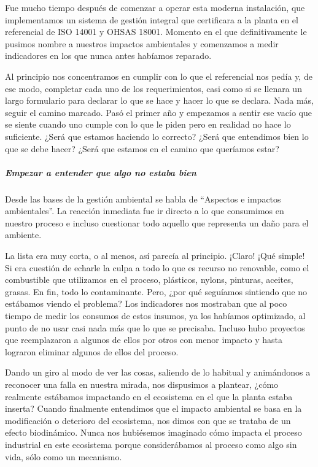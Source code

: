 \documentclass[
]{article}
\begin{document}
Fue mucho tiempo después de comenzar a operar esta moderna instalación,
que implementamos un sistema de gestión integral que certificara a la
planta en el referencial de ISO 14001 y OHSAS 18001. Momento en el que
definitivamente le pusimos nombre a nuestros impactos ambientales y
comenzamos a medir indicadores en los que nunca antes habíamos reparado.

Al principio nos concentramos en cumplir con lo que el referencial nos
pedía y, de ese modo, completar cada uno de los requerimientos, casi
como si se llenara un largo formulario para declarar lo que se hace y
hacer lo que se declara. Nada más, seguir el camino marcado. Pasó el
primer año y empezamos a sentir ese vacío que se siente cuando uno
cumple con lo que le piden pero en realidad no hace lo suficiente. ¿Será
que estamos haciendo lo correcto? ¿Será que entendimos bien lo que se
debe hacer? ¿Será que estamos en el camino que queríamos estar?

\hypertarget{empezar-a-entender-que-algo-no-estaba-bien}{%
\subparagraph{Empezar a entender que algo no estaba
bien}\label{empezar-a-entender-que-algo-no-estaba-bien}}

Desde las bases de la gestión ambiental se habla de ``Aspectos e
impactos ambientales''. La reacción inmediata fue ir directo a lo que
consumimos en nuestro proceso e incluso cuestionar todo aquello que
representa un daño para el ambiente.

La lista era muy corta, o al menos, así parecía al principio. ¡Claro!
¡Qué simple! Si era cuestión de echarle la culpa a todo lo que es
recurso no renovable, como el combustible que utilizamos en el proceso,
plásticos, nylons, pinturas, aceites, grasas. En fin, todo lo
contaminante. Pero, ¿por qué seguíamos sintiendo que no estábamos viendo
el problema? Los indicadores nos mostraban que al poco tiempo de medir
los consumos de estos insumos, ya los habíamos optimizado, al punto de
no usar casi nada más que lo que se precisaba. Incluso hubo proyectos
que reemplazaron a algunos de ellos por otros con menor impacto y hasta
lograron eliminar algunos de ellos del proceso.

Dando un giro al modo de ver las cosas, saliendo de lo habitual y
animándonos a reconocer una falla en nuestra mirada, nos dispusimos a
plantear, ¿cómo realmente estábamos impactando en el ecosistema en el
que la planta estaba inserta? Cuando finalmente entendimos que el
impacto ambiental se basa en la modificación o deterioro del ecosistema,
nos dimos con que se trataba de un efecto biodinámico. Nunca nos
hubiésemos imaginado cómo impacta el proceso industrial en este
ecosistema porque considerábamos al proceso como algo sin vida, sólo
como un mecanismo.
\end{document}
